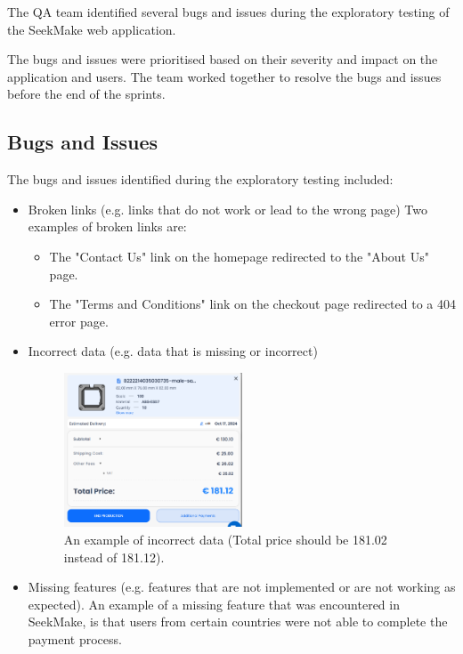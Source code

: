 The QA team identified several bugs and issues during the exploratory testing of the SeekMake web application.

The bugs and issues were prioritised based on their severity and impact on the application and users. The team worked together to resolve the bugs and issues before the end of the sprints.

\subsection{Bugs and Issues}

The bugs and issues identified during the exploratory testing included:

\begin{itemize}
    \item Broken links (e.g. links that do not work or lead to the wrong page)
          Two examples of broken links are:
          \begin{itemize}
              \item The "Contact Us" link on the homepage redirected to the "About Us" page.
              \item The "Terms and Conditions" link on the checkout page redirected to a 404 error page.
          \end{itemize}
    \item Incorrect data (e.g. data that is missing or incorrect)
          \begin{figure}[H]
              \centering
              \includegraphics[width=0.5\textwidth]{project/images/incorrect-data.png}
              \caption{An example of incorrect data (Total price should be 181.02 instead of 181.12).}
              \label{fig:incorrect-data}
          \end{figure}
    \item Missing features (e.g. features that are not implemented or are not working as expected). An example of a missing feature that was encountered in SeekMake, is that users from certain countries were not able to complete the payment process.

\end{itemize}
